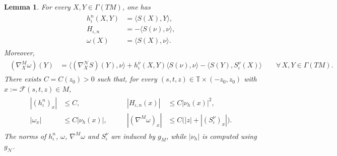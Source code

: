 \documentclass[a4paper,11pt,oneside,reqno]{amsart}
\numberwithin{equation}{section}
\newtheorem{lemma}[theorem]{Lemma}
\theoremstyle{definition}
\begin{document}
\begin{lemma}
    \label{lem:s4-normal-identities}
    For every $X,Y\in\Gamma(TM)$, one has
    \begin{align}
        \label{eq:s4-normal-identities}
        \begin{split}
            h_\iota^n(X,Y)&=\langle S(X),Y\rangle,\\
            H_{\iota,n}&=-\langle S(\nu),\nu\rangle,\\
            \omega(X)&=\langle S(X),\nu\rangle.
        \end{split}
    \end{align}
    Moreover,
    \begin{align}
        \label{eq:s4-omega-derivative}
        \begin{split}
            (\nabla^M_X\omega)(Y)&=\langle(\nabla^{\mathcal{N}}_XS)(Y),\nu\rangle+h_\iota^\nu(X,Y)\langle S(\nu),\nu\rangle-\langle S(Y),S_\iota^\nu (X)\rangle
            \qquad\forall\,X,Y\in\Gamma(TM).
        \end{split}
    \end{align}
    There exists $C=C(z_0)>0$ such that, for every
    $(s,t,z)\in\mathbb{T}\times(-z_0,z_0)$ with
    $x:=\mathcal{F}(s,t,z)\in M$,
    \begin{align}
        \label{eq:s4-normal-bounds}
        \begin{aligned}
            |(h_\iota^n)_x|&\leq C,
            &\qquad|H_{\iota,n}(x)|&\leq C|\nu_h(x)|^2,\\
            |\omega_x|&\leq C|\nu_h(x)|,
            &\qquad|(\nabla^M\omega)_x|
            &\leq C\bigl(|z|+|(S_\iota^\nu)_x|\bigr).
        \end{aligned}
    \end{align}
    The norms of $h_\iota^n$, $\omega$, $\nabla^M\omega$ and $S_\iota^\nu$ are induced by $g_M$, while $|\nu_h|$ is computed using $g_{\mathcal{N}}$.
\end{lemma}
\end{document}
